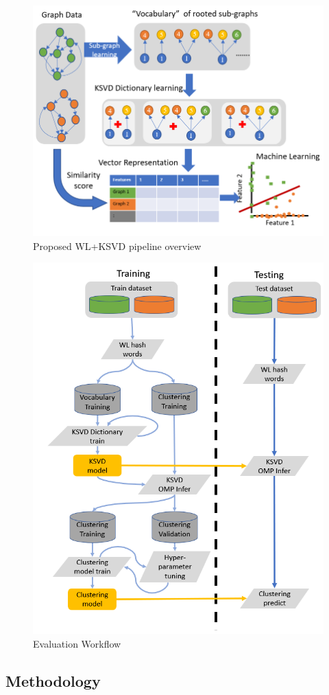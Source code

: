 \begin{figure}[!tbh]
\centerline{\includegraphics[width=0.9\columnwidth]{figures/Graph_embedding/GraphKSVD.png}}
\caption{Proposed WL+KSVD pipeline overview}\label{fig: GKSVD}
\end{figure}

\begin{figure}[!tbh]
\centerline{\includegraphics[width=0.7\columnwidth]{figures/Graph_embedding/Workflow.png}}
\caption{Evaluation Workflow}\label{fig: workflow}
\end{figure}

\subsection{Methodology}

